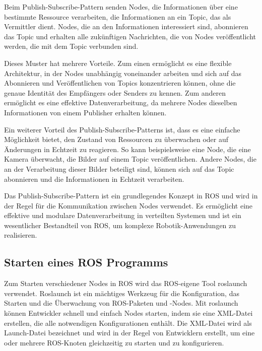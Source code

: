     Beim Publish-Subscribe-Pattern senden Nodes, die Informationen über eine bestimmte Ressource verarbeiten, die Informationen an ein Topic, das als Vermittler dient. Nodes, die an den Informationen interessiert sind, abonnieren das Topic und erhalten alle zukünftigen Nachrichten, die von Nodes veröffentlicht werden, die mit dem Topic verbunden sind.

    Dieses Muster hat mehrere Vorteile. Zum einen ermöglicht es eine flexible Architektur, in der Nodes unabhängig voneinander arbeiten und sich auf das Abonnieren und Veröffentlichen von Topics konzentrieren können, ohne die genaue Identität des Empfängers oder Senders zu kennen. Zum anderen ermöglicht es eine effektive Datenverarbeitung, da mehrere Nodes dieselben Informationen von einem Publisher erhalten können.

    Ein weiterer Vorteil des Publish-Subscribe-Patterns ist, dass es eine einfache Möglichkeit bietet, den Zustand von Ressourcen zu überwachen oder auf Änderungen in Echtzeit zu reagieren. So kann beispielsweise eine Node, die eine Kamera überwacht, die Bilder auf einem Topic veröffentlichen. Andere Nodes, die an der Verarbeitung dieser Bilder beteiligt sind, können sich auf das Topic abonnieren und die Informationen in Echtzeit verarbeiten.

    Das Publish-Subscribe-Pattern ist ein grundlegendes Konzept in \ac{ROS} und wird in der Regel für die Kommunikation zwischen Nodes verwendet. Es ermöglicht eine effektive und modulare Datenverarbeitung in verteilten Systemen und ist ein wesentlicher Bestandteil von \ac{ROS}, um komplexe Robotik-Anwendungen zu realisieren.


    \subsection{Starten eines ROS Programms} \label{starten eines ROS Programms:subsection}
    Zum Starten verschiedener Nodes in \ac{ROS} wird das ROS-eigene Tool roslaunch verwendet. Roslaunch ist ein mächtiges Werkzeug für die Konfiguration, das Starten und die Überwachung von ROS-Paketen und -Nodes. Mit roslaunch können Entwickler schnell und einfach Nodes starten, indem sie eine XML-Datei erstellen, die alle notwendigen Konfigurationen enthält. Die XML-Datei wird als Launch-Datei bezeichnet und wird in der Regel von Entwicklern erstellt, um eine oder mehrere ROS-Knoten gleichzeitig zu starten und zu konfigurieren.

